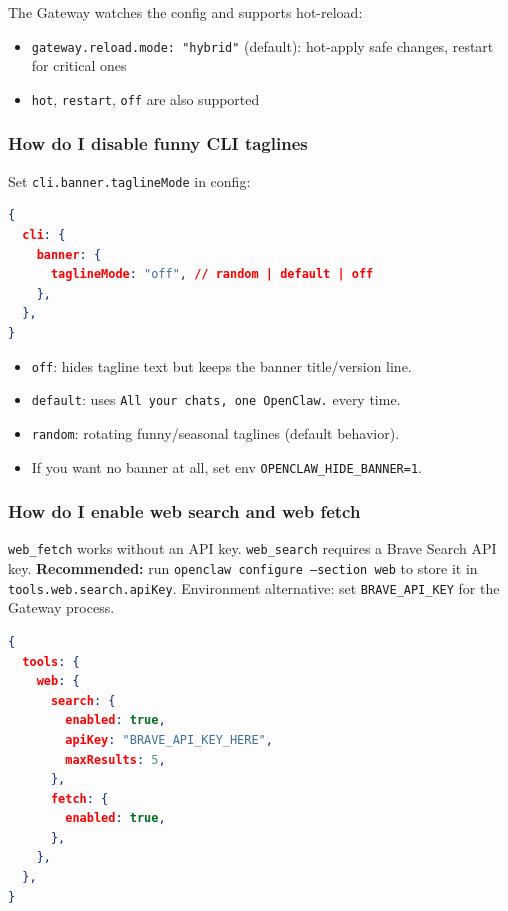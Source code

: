 The Gateway watches the config and supports hot-reload:

\begin{itemize}
  \item \texttt{gateway.reload.mode: "hybrid"} (default): hot-apply safe changes, restart for critical ones
  \item \texttt{hot}, \texttt{restart}, \texttt{off} are also supported
\end{itemize}


\subsubsection{How do I disable funny CLI taglines}


Set \texttt{cli.banner.taglineMode} in config:

\begin{lstlisting}[language=json]
{
  cli: {
    banner: {
      taglineMode: "off", // random | default | off
    },
  },
}
\end{lstlisting}


\begin{itemize}
  \item \texttt{off}: hides tagline text but keeps the banner title/version line.
  \item \texttt{default}: uses \texttt{All your chats, one OpenClaw.} every time.
  \item \texttt{random}: rotating funny/seasonal taglines (default behavior).
  \item If you want no banner at all, set env \texttt{OPENCLAW\_HIDE\_BANNER=1}.
\end{itemize}


\subsubsection{How do I enable web search and web fetch}


\texttt{web\_fetch} works without an API key. \texttt{web\_search} requires a Brave Search API
key. \textbf{Recommended:} run \texttt{openclaw configure --section web} to store it in
\texttt{tools.web.search.apiKey}. Environment alternative: set \texttt{BRAVE\_API\_KEY} for the
Gateway process.

\begin{lstlisting}[language=json]
{
  tools: {
    web: {
      search: {
        enabled: true,
        apiKey: "BRAVE_API_KEY_HERE",
        maxResults: 5,
      },
      fetch: {
        enabled: true,
      },
    },
  },
}
\end{lstlisting}


